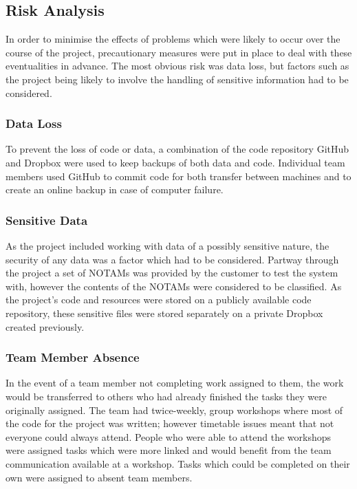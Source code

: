 \documentclass[a4paper, 12pt, twoside]{article}
\begin{document}
\subsection{Risk Analysis}
\label{sec:plan_risk_analysis}

In order to minimise the effects of problems which were likely to occur over the course of the project, precautionary measures were put in place to deal with these eventualities in advance. The most obvious risk was data loss, but factors such as the project being likely to involve the handling of sensitive information had to be considered.

\subsubsection{Data Loss}

To prevent the loss of code or data, a combination of the code repository GitHub and Dropbox were used to keep backups of both data and code. Individual team members used GitHub to commit code for both transfer between machines and to create an online backup in case of computer failure.

\subsubsection{Sensitive Data}

As the project included working with data of a possibly sensitive nature, the security of any data was a factor which had to be considered. Partway through the project a set of NOTAMs was provided by the customer to test the system with, however the contents of the NOTAMs were considered to be classified. As the project's code and resources were stored on a publicly available code repository, these sensitive files were stored separately on a private Dropbox created previously.

\subsubsection{Team Member Absence}

In the event of a team member not completing work assigned to them, the work would be transferred to others who had already finished the tasks they were originally assigned. The team had twice-weekly, group workshops where most of the code for the project was written; however timetable issues meant that not everyone could always attend. People who were able to attend the workshops were assigned tasks which were more linked and would benefit from the team communication available at a workshop. Tasks which could be completed on their own were assigned to absent team members.
\end{document}

